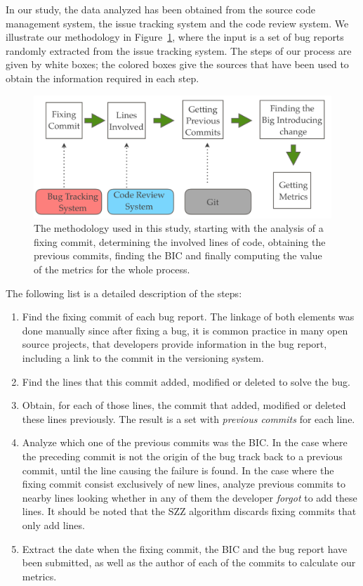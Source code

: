 \documentclass[10pt, conference]{IEEEtran}
\begin{document}
In our study, the data analyzed has been obtained from the source code management system, the issue tracking system and the code review system. We illustrate our methodology in Figure~\ref{fig:methodology}, where the input is a set of bug reports randomly extracted from the issue tracking system. The steps of our process are given by white boxes; the colored boxes give the sources that have been used to obtain the information required in each step.
\begin{figure}[ht]
\centering
\includegraphics[width=\columnwidth]{methodology.png}
\caption{The methodology used in this study, starting with the analysis of a fixing commit, determining the involved lines of code, obtaining the previous commits, finding the BIC and finally computing the value of the metrics for the whole process.}
\label{fig:methodology}       %
\end{figure}

The following list is a detailed description of the steps: 

\begin{enumerate}
		\item Find the fixing commit of each bug report. The linkage of both elements was done manually since after fixing a bug, it is common practice in many open source projects, that developers provide information in the bug report, including a link to the commit in the versioning system. 		
		\item Find the lines that this commit added, modified or deleted to solve the bug.
		\item Obtain, for each of those lines, the commit that added, modified or deleted these lines previously. The result is a set with \emph{previous commits} for each line.
		\item Analyze which one of the previous commits was the BIC. In the case where the preceding commit is not the origin of the bug track back to a previous commit, until the line causing the failure is found. In the case where the fixing commit consist exclusively of new lines, analyze previous commits to nearby lines looking whether in any of them the developer \emph{forgot} to add these lines. It should be noted that the SZZ algorithm discards fixing commits that only add lines.
		\item Extract the date when the fixing commit, the BIC and the bug report have been submitted, as well as the author of each of the commits to calculate our metrics.	
\end{enumerate} 
\end{document}
